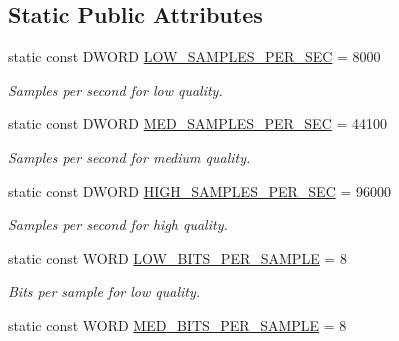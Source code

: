 \subsection*{Static Public Attributes}
\begin{DoxyCompactItemize}
\item 
\hypertarget{class_sound_format_a472e7ee028938594c9f726f5a83f60b0}{
static const DWORD \hyperlink{class_sound_format_a472e7ee028938594c9f726f5a83f60b0}{LOW\_\-SAMPLES\_\-PER\_\-SEC} = 8000}
\label{class_sound_format_a472e7ee028938594c9f726f5a83f60b0}

\begin{DoxyCompactList}\small\item\em Samples per second for low quality. \item\end{DoxyCompactList}\item 
\hypertarget{class_sound_format_ac51cd6a45429cbdbaff48dd3560c8afb}{
static const DWORD \hyperlink{class_sound_format_ac51cd6a45429cbdbaff48dd3560c8afb}{MED\_\-SAMPLES\_\-PER\_\-SEC} = 44100}
\label{class_sound_format_ac51cd6a45429cbdbaff48dd3560c8afb}

\begin{DoxyCompactList}\small\item\em Samples per second for medium quality. \item\end{DoxyCompactList}\item 
\hypertarget{class_sound_format_ae134c16bf6c4ee5ff2bba8ea0afccfb2}{
static const DWORD \hyperlink{class_sound_format_ae134c16bf6c4ee5ff2bba8ea0afccfb2}{HIGH\_\-SAMPLES\_\-PER\_\-SEC} = 96000}
\label{class_sound_format_ae134c16bf6c4ee5ff2bba8ea0afccfb2}

\begin{DoxyCompactList}\small\item\em Samples per second for high quality. \item\end{DoxyCompactList}\item 
\hypertarget{class_sound_format_ad8da01592ca00c7f77e9774f418b7117}{
static const WORD \hyperlink{class_sound_format_ad8da01592ca00c7f77e9774f418b7117}{LOW\_\-BITS\_\-PER\_\-SAMPLE} = 8}
\label{class_sound_format_ad8da01592ca00c7f77e9774f418b7117}

\begin{DoxyCompactList}\small\item\em Bits per sample for low quality. \item\end{DoxyCompactList}\item 
\hypertarget{class_sound_format_a9f09a258b73854f6477286e7c0460b4e}{
static const WORD \hyperlink{class_sound_format_a9f09a258b73854f6477286e7c0460b4e}{MED\_\-BITS\_\-PER\_\-SAMPLE} = 8}
\label{class_sound_format_a9f09a258b73854f6477286e7c0460b4e}


\end{DoxyCompactItemize}
